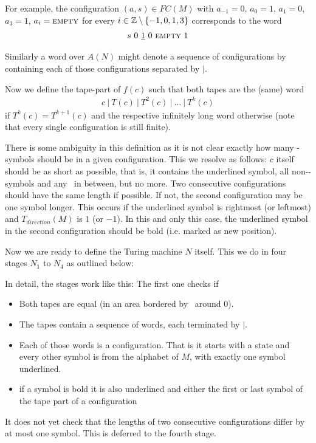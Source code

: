 	For example, the configuration $(a,s) \in FC(M)$ with $a_{-1} = 0$, $a_{0} = 1$, $a_{1} = 0$, $a_{3} = 1$, $a_i = \text{\scshape{empty}}$ for every $i \in \mathbb{Z} \setminus \{-1,0,1,3\}$ corresponds to the word
	\begin{align*}
		s~0~\underline{1}~0~\text{\scshape{empty}}~1
	\end{align*}

	Similarly a word over $A(N)$ might denote a sequence of configurations by containing each of those configurations separated by $|$.

	Now we define the tape-part of $f(c)$ such that both tapes are the (same) word
	\begin{align*}
		c~|~T(c)~|~T^2(c)~|~...~|~T^k(c)
	\end{align*}
	if $T^k(c) = T^{k+1}(c)$ and the respective infinitely long word otherwise (note that every single configuration is still finite).

	There is some ambiguity in this definition as it is not clear exactly how many \EMP-symbols should be in a given configuration.
	This we resolve as follows: $c$ itself should be as short as possible, that is, it contains the underlined symbol, all non-\EMP-symbols and any \EMP~in between, but no more.
	Two consecutive configurations should have the same length if possible. If not, the second configuration may be one symbol longer.
	This occurs if the underlined symbol is rightmost (or leftmost) and $T_{direction}(M)$ is $1$ (or $-1$).
	In this and only this case, the underlined symbol in the second configuration should be bold (i.e. marked as new position).

	Now we are ready to define the Turing machine $N$ itself. This we do in four stages $N_1$ to $N_4$ as outlined below:
	\begin{figure}[H]
		\centering
		
	\end{figure}
	
	In detail, the stages work like this:
	The first one checks if
	\begin{itemize}
		\item { Both tapes are equal (in an area bordered by \EMP~around $0$). }
		\item { The tapes contain a sequence of words, each terminated by $|$. }
		\item { Each of those words is a configuration. That is it starts with a state and every other symbol is from the alphabet of $M$, with exactly one symbol underlined. }
		\item { if a symbol is bold it is also underlined and either the first or last symbol of the tape part of a configuration }
	\end{itemize}
	It does not yet check that the lengths of two consecutive configurations differ by at most one symbol. This is deferred to the fourth stage.

